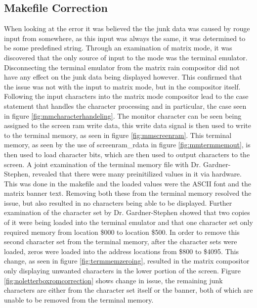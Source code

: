 
\subsection{Makefile Correction}

\label{Ch5 Sec2 Sub1}

When looking at the error it was believed the the junk data was caused by rouge input from somewhere, as this input was always the same, it was determined to be some predefined string. Through an examination of matrix mode, it was discovered that the only source of input to the mode was the terminal emulator. Disconnecting the terminal emulator from the matrix rain compositor did not have any effect on the junk data being displayed however. This confirmed that the issue was not with the input to matrix mode, but in the compositor itself. Following the input characters into the matrix mode compositor lead to the case statement that handles the character processing and in particular, the case seen in figure \ref{fig:mmcharacterhandeling}. The monitor character can be seen being assigned to the screen ram write data, this write data signal is then used to write to the terminal memory, as seen in figure \ref{fig:mmscreenram}. This terminal memory, as seen by the use of screenram\_rdata in figure \ref{fig:mmtermmemout}, is then used to load character bits, which are then used to output characters to the screen. A joint examination of the terminal memory file with Dr. Gardner-Stephen, revealed that there were many preinitilized values in it via hardware. This was done in the makefile and the loaded values were the ASCII font and the matrix banner text. Removing both these from the terminal memory resolved the issue, but also resulted in no characters being able to be displayed. Further examination of the character set by Dr. Gardner-Stephen showed that two copies of it were being loaded into the terminal emulator and that one character set only required memory from location \$000 to location \$500. In order to remove this second character set from the terminal memory, after the character sets were loaded, zeros were loaded into the address locations from \$800 to \$4095. This change, as seen in figure \ref{fig:termmemzeroing}, resulted in the matrix compositor only displaying unwanted characters in the lower portion of the screen. Figure \ref{fig:noletterboxromcorrection} shows change in issue, the remaining junk characters are either from the character set itself or the banner, both of which are unable to be removed from the terminal memory.


